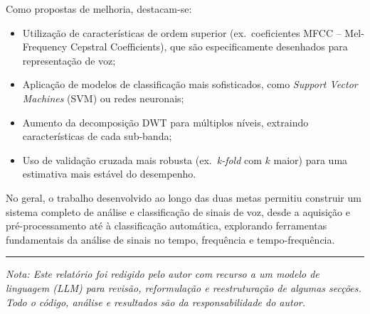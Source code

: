 \documentclass[12pt]{article}
\begin{document}
Como propostas de melhoria, destacam-se:
\begin{itemize}
    \item Utilização de características de ordem superior (ex.\ coeficientes MFCC -- Mel-Frequency
    Cepstral Coefficients), que são especificamente desenhados para representação de voz;
    \item Aplicação de modelos de classificação mais sofisticados, como \textit{Support Vector
    Machines} (SVM) ou redes neuronais;
    \item Aumento da decomposição DWT para múltiplos níveis, extraindo características de cada
    sub-banda;
    \item Uso de validação cruzada mais robusta (ex.\ \textit{k-fold} com $k$ maior) para uma
    estimativa mais estável do desempenho.
\end{itemize}

No geral, o trabalho desenvolvido ao longo das duas metas permitiu construir um sistema completo
de análise e classificação de sinais de voz, desde a aquisição e pré-processamento até à
classificação automática, explorando ferramentas fundamentais da análise de sinais no tempo,
frequência e tempo-frequência.

\vspace{2em}
\noindent\rule{\textwidth}{0.4pt}
\vspace{0.5em}

\noindent\small\textit{Nota: Este relatório foi redigido pelo autor com recurso a um modelo de
linguagem (LLM) para revisão, reformulação e reestruturação de algumas secções. Todo o código,
análise e resultados são da responsabilidade do autor.}
\end{document}
